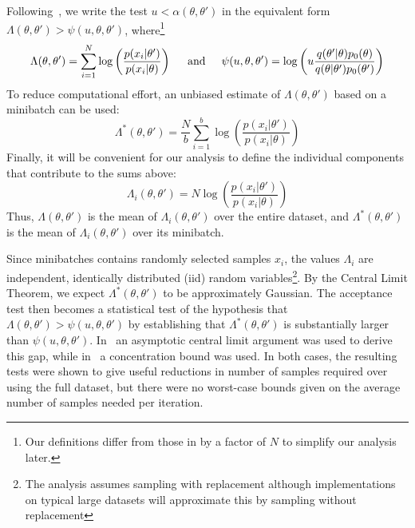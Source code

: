 \documentclass{article}
\begin{document}
Following~\cite{icml2014c1_bardenet14}, we write the test $u <
\alpha(\theta,\theta')$ in the equivalent form $\Lambda(\theta,\theta') >
\psi(u,\theta,\theta')$, where\footnote{Our definitions differ from those in
\cite{icml2014c1_bardenet14} by a factor of $N$ to simplify our analysis later.}
\begin{equation}
\Lambda(\theta,\theta') = \sum_{i=1}^N \log\left(\frac{p(x_i|\theta')}{p(x_i|\theta)}\right)  
\hspace{0.2in} {\rm and} \hspace{0.2in}
\psi(u,\theta,\theta') = \log\left(u\frac{q(\theta'|\theta)p_0(\theta)}{q(\theta|\theta')p_0(\theta')}\right)
\end{equation}
To reduce computational effort, an unbiased estimate of $\Lambda(\theta,\theta')$
based on a minibatch can be used:
\begin{equation}
\Lambda^*(\theta,\theta') = \frac{N}{b}\sum_{i=1}^b \log\left(\frac{p(x_i|\theta')}{p(x_i|\theta)}\right)  
\end{equation}
Finally, it will be convenient for our analysis to define the individual
components that contribute to the sums above:
\begin{equation}\label{eq:individual_terms}
\Lambda_i(\theta,\theta') = N \log\left(\frac{p(x_i|\theta')}{p(x_i|\theta)}\right)  
\end{equation}
Thus, $\Lambda(\theta,\theta')$ is the mean of $\Lambda_i(\theta,\theta')$ over
the entire dataset, and $\Lambda^*(\theta,\theta')$ is the mean of
$\Lambda_i(\theta,\theta')$ over its minibatch. 

Since minibatches contains randomly selected samples $x_i$, the values
$\Lambda_i$ are independent, identically distributed (iid) random
variables\footnote{The analysis assumes sampling with replacement
  although implementations on typical large datasets will approximate
  this by sampling without replacement}.
By the Central Limit Theorem, we expect $\Lambda^*(\theta,\theta')$ to
be approximately Gaussian. The acceptance test then becomes a
statistical test of the hypothesis that
$\Lambda(\theta,\theta')>\psi(u,\theta,\theta')$ by establishing that
$\Lambda^*(\theta,\theta')$ is substantially larger than
$\psi(u,\theta,\theta')$.  In~\cite{cutting_mh_2014} an asymptotic
central limit argument was used to derive this gap, while
in~\cite{icml2014c1_bardenet14} a concentration bound was used. In
both cases, the resulting tests were shown to give useful reductions
in number of samples required over using the full dataset, but there
were no worst-case bounds given on the average number of samples
needed per iteration.
\end{document}
